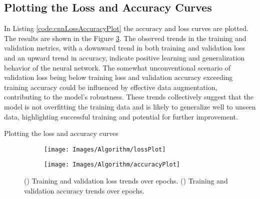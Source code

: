 \subsection{Plotting the Loss and Accuracy Curves}

In Listing \ref{code:cnnLossAccuracyPlot} the accuracy and loss curves are plotted. The results are shown in the Figure \ref{fig:AccuracyandLoss}. The observed trends in the training and validation metrics, with a downward trend in both training and validation loss and an upward trend in accuracy, indicate positive learning and generalization behavior of the neural network. The somewhat unconventional scenario of validation loss being below training loss and validation accuracy exceeding training accuracy could be influenced by effective data augmentation, contributing to the model's robustness. These trends collectively suggest that the model is not overfitting the training data and is likely to generalize well to unseen data, highlighting successful training and potential for further improvement.

\begin{code}[h!]
	    
	\caption{Plotting the loss and accuracy curves}
	\label{code:cnnLossAccuracyPlot}
\end{code}

\begin{figure}[h!]
	\centering
	
	\begin{subfigure}{0.45\textwidth}
		\texttt{[image: Images/Algorithm/lossPlot]}
		\caption{}    %
		\label{subfig:lossTrends}
	\end{subfigure}
	\hfill
	\begin{subfigure}{0.45\textwidth}
		\texttt{[image: Images/Algorithm/accuracyPlot]}
		\caption{}    %
		\label{subfig:accuracyTrends}
	\end{subfigure}
	
	\caption{() Training and validation loss trends over epochs. () Training and validation accuracy trends over epochs.}
	\label{fig:AccuracyandLoss}
\end{figure}

